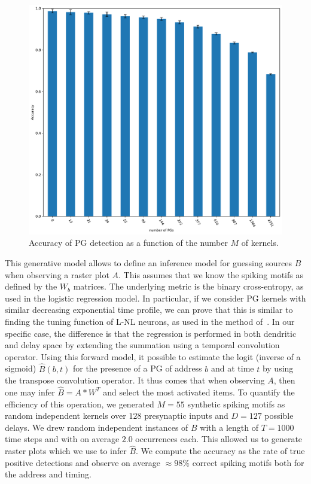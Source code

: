 \documentclass[11pt]{article}
\begin{document}
\begin{figure}
\vspace{-15pt}
\includegraphics[width=\linewidth]{figure_N_PGs.pdf}
\vspace{-25pt}
{
\caption{Accuracy of PG detection as a function of the number $M$ of kernels.
}
\label{fig:2}
}
\vspace{-10pt}
\end{figure}
This generative model allows to define an inference model for guessing sources $B$ when observing a raster plot $A$. This assumes that we know the spiking motifs as defined by the $W_b$ matrices. The underlying metric is the binary cross-entropy, as used in the logistic regression model. In particular, if we consider PG kernels with similar decreasing exponential time profile, we can prove that this is similar to finding the tuning function of L-NL neurons, as used in the method of~\parencite{berens_fast_2012}. In our specific case, the difference is that the regression is performed in both dendritic and delay space by extending the summation using a temporal convolution operator. Using this forward model, it possible to estimate the logit (inverse of a sigmoid) $\hat{B}(b, t)$ for the presence of a PG of address $b$ and at time $t$ by using the transpose convolution operator. It thus comes that when observing $A$, then one may infer $\hat{B} = A \ast W^T$ and select the most activated items. To quantify the efficiency of this operation, we generated $M=55$ synthetic spiking motifs as random independent kernels over $128$ presynaptic inputs and $D=127$ possible delays. We drew random independent instances of $B$ with a length of $T=1000$ time steps and with on average $2.0$ occurrences each. This allowed us to generate raster plots which we use to infer $\hat{B}$. We compute the accuracy as the rate of true positive detections and observe on average $\approx 98\%$ correct spiking motifs both for the address and %
timing.
\end{document}
